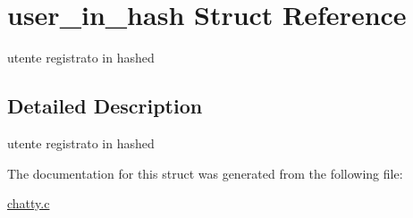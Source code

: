 \hypertarget{structuser__in__hash}{}\section{user\+\_\+in\+\_\+hash Struct Reference}
\label{structuser__in__hash}


utente registrato in hashed  




\subsection{Detailed Description}
utente registrato in hashed 

The documentation for this struct was generated from the following file\+:\begin{DoxyCompactItemize}
\item 
\hyperlink{chatty_8c}{chatty.\+c}\end{DoxyCompactItemize}
